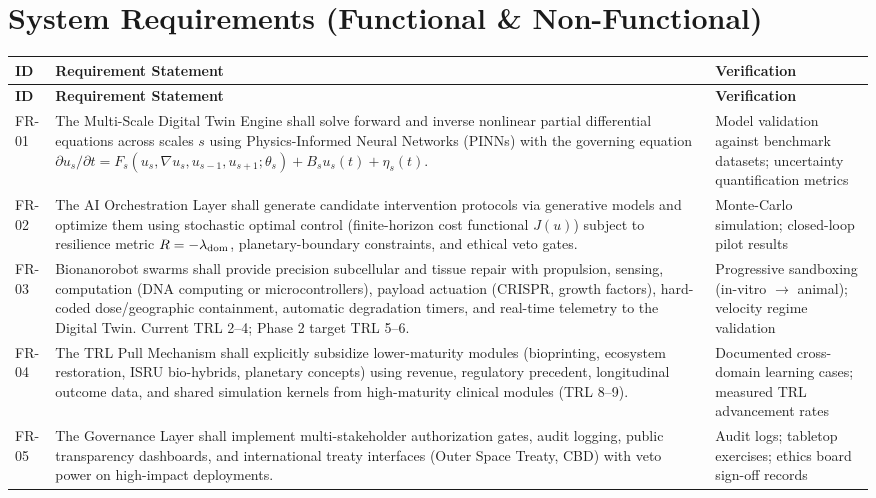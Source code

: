 \documentclass[11pt,a4paper]{report}
\begin{document}
\section{System Requirements (Functional \& Non-Functional)}

\begin{longtable}{>{\raggedright\arraybackslash}p{2cm} >{\raggedright\arraybackslash}p{9cm} p{2.5cm}}
\toprule
\textbf{ID} & \textbf{Requirement Statement} & \textbf{Verification} \\
\midrule
\endfirsthead
\toprule
\textbf{ID} & \textbf{Requirement Statement} & \textbf{Verification} \\
\midrule
\endhead
\bottomrule
\endfoot
FR-01 & The Multi-Scale Digital Twin Engine shall solve forward and inverse nonlinear partial differential equations across scales $s$ using Physics-Informed Neural Networks (PINNs) with the governing equation $\partial u_s / \partial t = F_s(u_s, \nabla u_s, u_{s-1}, u_{s+1}; \theta_s) + B_s u_s(t) + \eta_s(t)$. & Model validation against benchmark datasets; uncertainty quantification metrics \\
FR-02 & The AI Orchestration Layer shall generate candidate intervention protocols via generative models and optimize them using stochastic optimal control (finite-horizon cost functional $J(u)$) subject to resilience metric $R = -\lambda_{\rm dom}$, planetary-boundary constraints, and ethical veto gates. & Monte-Carlo simulation; closed-loop pilot results \\
FR-03 & Bionanorobot swarms shall provide precision subcellular and tissue repair with propulsion, sensing, computation (DNA computing or microcontrollers), payload actuation (CRISPR, growth factors), hard-coded dose/geographic containment, automatic degradation timers, and real-time telemetry to the Digital Twin. Current TRL 2--4; Phase 2 target TRL 5--6. & Progressive sandboxing (in-vitro $\to$ animal); velocity regime validation \\
FR-04 & The TRL Pull Mechanism shall explicitly subsidize lower-maturity modules (bioprinting, ecosystem restoration, ISRU bio-hybrids, planetary concepts) using revenue, regulatory precedent, longitudinal outcome data, and shared simulation kernels from high-maturity clinical modules (TRL 8--9). & Documented cross-domain learning cases; measured TRL advancement rates \\
FR-05 & The Governance Layer shall implement multi-stakeholder authorization gates, audit logging, public transparency dashboards, and international treaty interfaces (Outer Space Treaty, CBD) with veto power on high-impact deployments. & Audit logs; tabletop exercises; ethics board sign-off records \\

\end{longtable}
\end{document}
